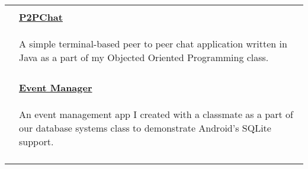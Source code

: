 \documentclass[letterpaper,11pt,oneside]{article}
\begin{document}
\begin{tabularx}{\textwidth}{l X}
    & \\
    \vspace{-1.5ex} & \textbf{\href{https://github.com/prati0100/P2PChat}{P2PChat}} \\
    \vspace{-3ex} & \begin{adjustwidth}{}{}A simple terminal-based peer to peer chat application written in Java as a part of my Objected Oriented Programming class.\end{adjustwidth} \\
    & \\
    \vspace{-1.5ex} & \textbf{\href{https://github.com/prati0100/EventManager}{Event Manager}} \\
    \vspace{-3ex} & \begin{adjustwidth}{}{}An event management app I created with a classmate as a part of our database systems class to demonstrate Android's SQLite support.\end{adjustwidth} \\
    & \\

\end{tabularx}
\end{document}
